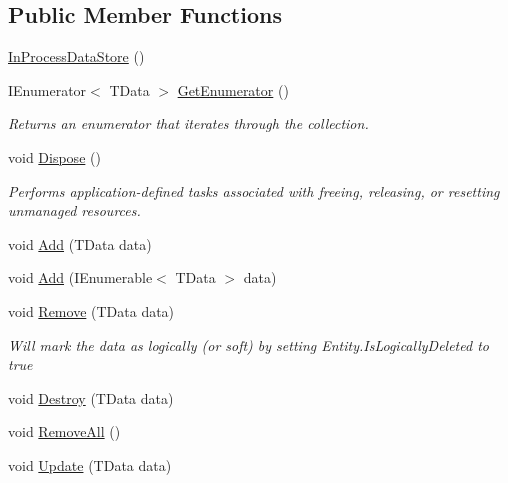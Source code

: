 \subsection*{Public Member Functions}
\begin{DoxyCompactItemize}
\item 
\hyperlink{classCqrs_1_1DataStores_1_1InProcessDataStore_a86a0ef4945e0f2fa45027ceb3261d284_a86a0ef4945e0f2fa45027ceb3261d284}{In\+Process\+Data\+Store} ()
\item 
I\+Enumerator$<$ T\+Data $>$ \hyperlink{classCqrs_1_1DataStores_1_1InProcessDataStore_a867c2badec9f0669cf70257f5572b701_a867c2badec9f0669cf70257f5572b701}{Get\+Enumerator} ()
\begin{DoxyCompactList}\small\item\em Returns an enumerator that iterates through the collection. \end{DoxyCompactList}\item 
void \hyperlink{classCqrs_1_1DataStores_1_1InProcessDataStore_a220126a1dd0e318197b9c994c313d5fd_a220126a1dd0e318197b9c994c313d5fd}{Dispose} ()
\begin{DoxyCompactList}\small\item\em Performs application-\/defined tasks associated with freeing, releasing, or resetting unmanaged resources. \end{DoxyCompactList}\item 
void \hyperlink{classCqrs_1_1DataStores_1_1InProcessDataStore_ade5c4033c628598665c0cba986a54c15_ade5c4033c628598665c0cba986a54c15}{Add} (T\+Data data)
\item 
void \hyperlink{classCqrs_1_1DataStores_1_1InProcessDataStore_ad62504e478f0a907c18ec4aa9b42703a_ad62504e478f0a907c18ec4aa9b42703a}{Add} (I\+Enumerable$<$ T\+Data $>$ data)
\item 
void \hyperlink{classCqrs_1_1DataStores_1_1InProcessDataStore_a43a93c614a403181e0641106ca9509d6_a43a93c614a403181e0641106ca9509d6}{Remove} (T\+Data data)
\begin{DoxyCompactList}\small\item\em Will mark the {\itshape data}  as logically (or soft) by setting Entity.\+Is\+Logically\+Deleted to true \end{DoxyCompactList}\item 
void \hyperlink{classCqrs_1_1DataStores_1_1InProcessDataStore_a1fc7a3935f52087f3703b652e77f0b75_a1fc7a3935f52087f3703b652e77f0b75}{Destroy} (T\+Data data)
\item 
void \hyperlink{classCqrs_1_1DataStores_1_1InProcessDataStore_acd350f7abef7311064434ae31a50755b_acd350f7abef7311064434ae31a50755b}{Remove\+All} ()
\item 
void \hyperlink{classCqrs_1_1DataStores_1_1InProcessDataStore_af70e6f6e5aabc24ee12ef3d2bcd3bf60_af70e6f6e5aabc24ee12ef3d2bcd3bf60}{Update} (T\+Data data)
\end{DoxyCompactItemize}
